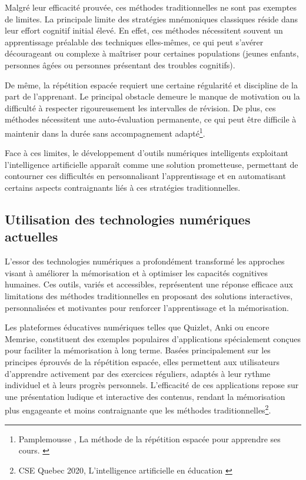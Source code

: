 \documentclass[11pt,a4paper]{report}
\begin{document}
Malgré leur efficacité prouvée, ces méthodes traditionnelles ne sont pas exemptes de limites. La principale limite des stratégies mnémoniques classiques réside dans leur effort cognitif initial élevé. En effet, ces méthodes nécessitent souvent un apprentissage préalable des techniques elles-mêmes, ce qui peut s’avérer décourageant ou complexe à maîtriser pour certaines populations (jeunes enfants, personnes âgées ou personnes présentant des troubles cognitifs).

De même, la répétition espacée requiert une certaine régularité et discipline de la part de l’apprenant. Le principal obstacle demeure le manque de motivation ou la difficulté à respecter rigoureusement les intervalles de révision. De plus, ces méthodes nécessitent une auto-évaluation permanente, ce qui peut être difficile à maintenir dans la durée sans accompagnement adapté\footnote{Pamplemousse , La méthode de la répétition espacée pour apprendre ses cours. \cite{pamplemousse}}.

Face à ces limites, le développement d’outils numériques intelligents exploitant l'intelligence artificielle apparaît comme une solution prometteuse, permettant de contourner ces difficultés en personnalisant l'apprentissage et en automatisant certains aspects contraignants liés à ces stratégies traditionnelles.

\subsection{Utilisation des technologies numériques actuelles}

L’essor des technologies numériques a profondément transformé les approches visant à améliorer la mémorisation et à optimiser les capacités cognitives humaines. Ces outils, variés et accessibles, représentent une réponse efficace aux limitations des méthodes traditionnelles en proposant des solutions interactives, personnalisées et motivantes pour renforcer l’apprentissage et la mémorisation.

Les plateformes éducatives numériques telles que Quizlet, Anki ou encore Memrise, constituent des exemples populaires d’applications spécialement conçues pour faciliter la mémorisation à long terme. Basées principalement sur les principes éprouvés de la répétition espacée, elles permettent aux utilisateurs d’apprendre activement par des exercices réguliers, adaptés à leur rythme individuel et à leurs progrès personnels. L'efficacité de ces applications repose sur une présentation ludique et interactive des contenus, rendant la mémorisation plus engageante et moins contraignante que les méthodes traditionnelles\footnote{CSE Quebec 2020, L’intelligence artificielle en éducation \cite{hypotheses}}.
\end{document}
